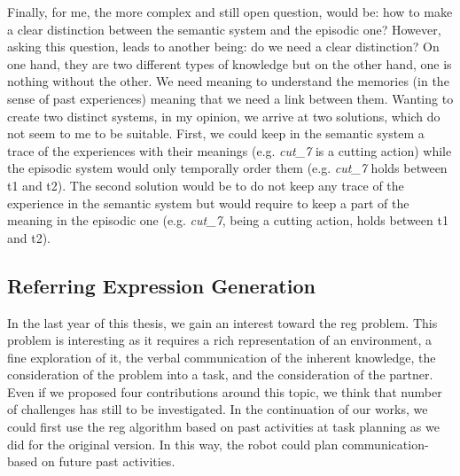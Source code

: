 Finally, for me, the more complex and still open question, would be: how to make a clear distinction between the semantic system and the episodic one? However, asking this question, leads to another being: do we need a clear distinction? On one hand, they are two different types of knowledge but on the other hand, one is nothing without the other. We need meaning to understand the memories (in the sense of past experiences) meaning that we need a link between them. Wanting to create two distinct systems, in my opinion, we arrive at two solutions, which do not seem to me to be suitable. First, we could keep in the semantic system a trace of the experiences with their meanings (e.g. \textit{cut\_7} is a cutting action) while the episodic system would only temporally order them (e.g. \textit{cut\_7} holds between t1 and t2). The second solution would be to do not keep any trace of the experience in the semantic system but would require to keep a part of the meaning in the episodic one (e.g. \textit{cut\_7}, being a cutting action, holds between t1 and t2).

\subsection*{Referring Expression Generation}

In the last year of this thesis, we gain an interest toward the \acrfull{reg} problem. This problem is interesting as it requires a rich representation of an environment, a fine exploration of it, the verbal communication of the inherent knowledge, the consideration of the problem into a task, and the consideration of the partner. Even if we proposed four contributions around this topic, we think that number of challenges has still to be investigated. In the continuation of our works, we could first use the \acrshort{reg} algorithm based on past activities at task planning as we did for the original version. In this way, the robot could plan communication-based on future past activities.


